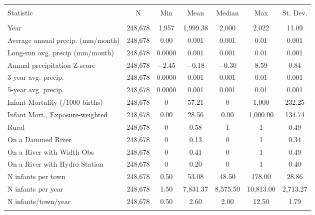 
\begin{tabular}{@{\extracolsep{5pt}}lcccccc} 
\\[-1.8ex]\hline \\[-1.8ex] 
Statistic & \multicolumn{1}{c}{N} & \multicolumn{1}{c}{Min} & \multicolumn{1}{c}{Mean} & \multicolumn{1}{c}{Median} & \multicolumn{1}{c}{Max} & \multicolumn{1}{c}{St. Dev.} \\ 
\hline 
\hline \\[-1.8ex] 
Year & 248,678 & 1,957 & 1,999.38 & 2,000 & 2,022 & 11.09 \\ 
Average annual precip. (mm/month) & 248,678 & 0.00 & 0.001 & 0.001 & 0.01 & 0.001 \\ 
Long-run avg. precip (mm/month) & 248,678 & 0.0000 & 0.001 & 0.001 & 0.01 & 0.001 \\ 
Annual precipitation Z-score & 248,678 & $-$2.45 & $-$0.18 & $-$0.30 & 8.59 & 0.84 \\ 
3-year avg. precip. & 248,678 & 0.0000 & 0.001 & 0.001 & 0.01 & 0.001 \\ 
5-year avg. precip. & 248,678 & 0.0000 & 0.001 & 0.001 & 0.01 & 0.001 \\ 
Infant Mortality (/1000 births) & 248,678 & 0 & 57.21 & 0 & 1,000 & 232.25 \\ 
Infant Mort., Exposure-weighted & 248,678 & 0.00 & 28.56 & 0.00 & 1,000.00 & 134.74 \\ 
Rural & 248,678 & 0 & 0.58 & 1 & 1 & 0.49 \\ 
On a Dammed River & 248,678 & 0 & 0.13 & 0 & 1 & 0.34 \\ 
On a River with Width Obs & 248,678 & 0 & 0.41 & 0 & 1 & 0.49 \\ 
On a River with Hydro Station & 248,678 & 0 & 0.20 & 0 & 1 & 0.40 \\ 
N infants per town & 248,678 & 0.50 & 53.08 & 48.50 & 178.00 & 28.86 \\ 
N infants per year & 248,678 & 1.50 & 7,831.37 & 8,575.50 & 10,813.00 & 2,713.27 \\ 
N infants/town/year & 248,678 & 0.50 & 2.60 & 2.00 & 12.50 & 1.79 \\ 
\hline 
\hline \\[-1.8ex] 
\end{tabular} 
